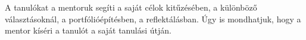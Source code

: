 A tanulókat a mentoruk segíti a saját célok kitűzésében, a különböző választásoknál, a portfólióépítésben, a reflektálásban. Úgy is mondhatjuk, hogy a mentor kíséri a tanulót a saját tanulási útján.
\begin{comment}

\begin{quote}
Példa: Szeretek kirándulni, és izgatnak az extrém sportok is. Ezért a mentorommal való beszélgetés után azt tűztem ki egyik célomul, hogy megmászom egy hegyet. Hogy hogyan, milyen úton jutok a csúcsra, azt a tanárok segítenek kialakítani. Útközben fotózom. Időnként megállok, és újratervezem az utat az alapján, hogy még mindig oda akarok-e eljutni. Jó helyen vagyok?
Jól haladok? Minden tudásom és eszközöm megvan ahhoz, hogy a célomat elérjem?
Amikor végre felérek a csúcsra, ott is fotózom. A fotósorozat bekerül a portfóliómba.
A portfólióm akkor is bővül, ha véletlenül nem érnék fel a csúcsra, mert nem vagyok még kész, hogy megmásszam a hegyet.
\end{quote}

\begin{table}
\centering
\begin{tabular}{@{}p{2cm}|p{4cm}|p{4cm}@{}}

& \textbf{Hagyományos}  & \textbf{ Személyre szabott}
\\ \hline
  Mi alapján döntjük el, hogy mit tanulunk? &
  Nemzeti tantervek, következő iskolák igénye &
  Tanulók saját céljai, érdeklődése és a tantárgyi alapú fejlesztési célok egyensúlya \\
\hline
  A tanulási folyamat célja &
   Mindenkinek közös, a következő intézményre felkészítés fő célként jelenik meg &
   Mindenki saját érdeklődése és célja alapján \\
\hline
   Visszajelzés alapja &
   Az álami kerettantervhez viszonyított tudás mérése &
   A saját célokhoz viszonyítva hol tart (elérte, még nem érte el)
   Közösség többi tagjától kapott visszajelzés.  \\
\hline
  Tantárgyak napi ritmusának kialakítása &
   Előre meghatározott tanmenet alapján, előre történik &
   Két-három havonta újratervezve a célok és az elért eredmények alapján   \\

\end{tabular}
\caption{A hagyományos iskolák és a személyre szabott tanulási környezetek megközelítése teljesen eltér egymástól}

\label{tbl:szemelyreszabott}


\end{comment}

